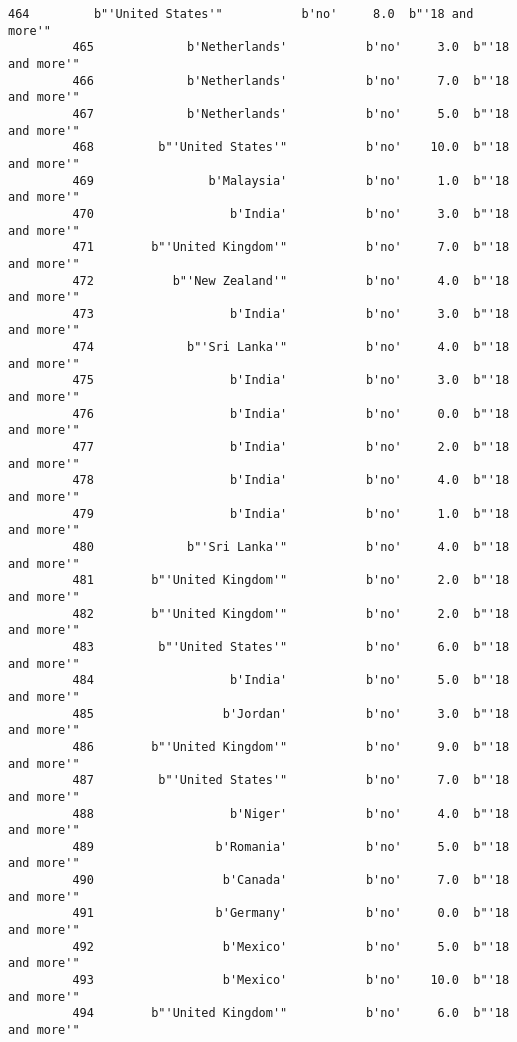 \documentclass[11pt]{article}
\begin{document}
\begin{Verbatim}[commandchars=\\\{\}]
         464         b"'United States'"           b'no'     8.0  b"'18 and more'"   
         465             b'Netherlands'           b'no'     3.0  b"'18 and more'"   
         466             b'Netherlands'           b'no'     7.0  b"'18 and more'"   
         467             b'Netherlands'           b'no'     5.0  b"'18 and more'"   
         468         b"'United States'"           b'no'    10.0  b"'18 and more'"   
         469                b'Malaysia'           b'no'     1.0  b"'18 and more'"   
         470                   b'India'           b'no'     3.0  b"'18 and more'"   
         471        b"'United Kingdom'"           b'no'     7.0  b"'18 and more'"   
         472           b"'New Zealand'"           b'no'     4.0  b"'18 and more'"   
         473                   b'India'           b'no'     3.0  b"'18 and more'"   
         474             b"'Sri Lanka'"           b'no'     4.0  b"'18 and more'"   
         475                   b'India'           b'no'     3.0  b"'18 and more'"   
         476                   b'India'           b'no'     0.0  b"'18 and more'"   
         477                   b'India'           b'no'     2.0  b"'18 and more'"   
         478                   b'India'           b'no'     4.0  b"'18 and more'"   
         479                   b'India'           b'no'     1.0  b"'18 and more'"   
         480             b"'Sri Lanka'"           b'no'     4.0  b"'18 and more'"   
         481        b"'United Kingdom'"           b'no'     2.0  b"'18 and more'"   
         482        b"'United Kingdom'"           b'no'     2.0  b"'18 and more'"   
         483         b"'United States'"           b'no'     6.0  b"'18 and more'"   
         484                   b'India'           b'no'     5.0  b"'18 and more'"   
         485                  b'Jordan'           b'no'     3.0  b"'18 and more'"   
         486        b"'United Kingdom'"           b'no'     9.0  b"'18 and more'"   
         487         b"'United States'"           b'no'     7.0  b"'18 and more'"   
         488                   b'Niger'           b'no'     4.0  b"'18 and more'"   
         489                 b'Romania'           b'no'     5.0  b"'18 and more'"   
         490                  b'Canada'           b'no'     7.0  b"'18 and more'"   
         491                 b'Germany'           b'no'     0.0  b"'18 and more'"   
         492                  b'Mexico'           b'no'     5.0  b"'18 and more'"   
         493                  b'Mexico'           b'no'    10.0  b"'18 and more'"   
         494        b"'United Kingdom'"           b'no'     6.0  b"'18 and more'"   

\end{Verbatim}
\end{document}
